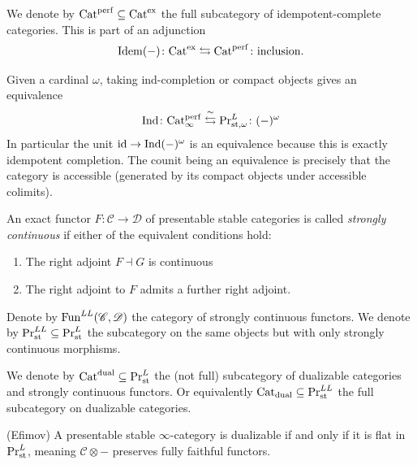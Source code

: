 \begin{notation} We denote by $\mathrm{Cat}^{\mathrm{perf}} \subseteq \mathrm{Cat}^{\mathrm{ex}}$ the full subcategory of idempotent-complete categories. This is part of an adjunction
\begin{align*}
    \mathrm{Idem}(-) \colon \mathrm{Cat}^{\mathrm{ex}} \leftrightarrows \mathrm{Cat}^{\mathrm{perf}} \colon \text{inclusion}.
\end{align*}
\end{notation}

Given a cardinal $\omega$, taking ind-completion or compact objects gives an equivalence
\begin{align*}
    \mathrm{Ind} \colon \mathrm{Cat}_\infty^{\mathrm{perf}} \overset{\sim}{\leftrightarrows} \mathrm{Pr}^L_{\mathrm{st},\omega} \colon (-)^\omega
\end{align*}
In particular the unit $\mathrm{id} \to \mathrm{Ind}(-)^\omega$ is an equivalence because this is exactly idempotent completion. The counit being an equivalence is precisely that the category is accessible (generated by its compact objects under accessible colimits).


\begin{definition} An exact functor $F \colon \mathscr{C} \to \mathscr{D}$ of presentable stable categories is called \textit{strongly continuous} if either of the equivalent conditions hold:
\begin{enumerate}
    \item The right adjoint $F \dashv G$ is continuous
    \item The right adjoint to $F$ admits a further right adjoint.
\end{enumerate}
Denote by $\mathrm{Fun}^{LL}(\mathscr{C},\mathscr{D})$ the category of strongly continuous functors. We denote by $\mathrm{Pr}_{\mathrm{st}}^{LL} \subseteq \mathrm{Pr}_{\mathrm{st}}^L$ the subcategory on the same objects but with only strongly continuous morphisms.
\end{definition}





\begin{definition} We denote by $\mathrm{Cat}^{\mathrm{dual}} \subseteq \mathrm{Pr}^L_{\mathrm{st}}$ the (not full) subcategory of dualizable categories and strongly continuous functors. Or equivalently $\mathrm{Cat}_{\mathrm{dual}} \subseteq \mathrm{Pr}_{\mathrm{st}}^{LL}$ the full subcategory on dualizable categories.
\end{definition}

\begin{theorem} (Efimov) A presentable stable $\infty$-category is dualizable if and only if it is flat in $\mathrm{Pr}^L_{\mathrm{st}}$, meaning $\mathscr{C} \otimes -$ preserves fully faithful functors.
\end{theorem}


